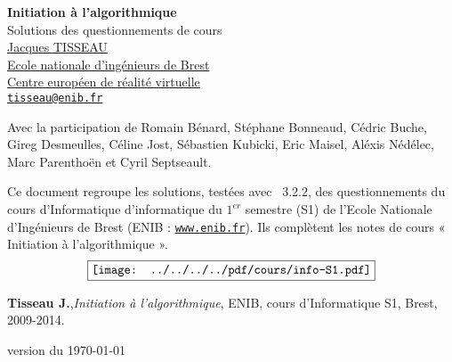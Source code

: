 \documentclass[11pt,a4paper,colorlinks,breaklinks]{article}
\renewcommand{\headrulewidth}{0pt}
\renewcommand{\footrulewidth}{0pt}
\begin{document}

\begin{titlepage}

\thispagestyle{fancy}
\setlength{\headheight}{79pt}
\setlength{\footskip}{20pt}
\renewcommand{\headrulewidth}{0pt}
\renewcommand{\footrulewidth}{0pt}

\begin{center}
{\huge\bf Initiation à l'algorithmique}\\[5mm]
{\huge\sc Solutions des questionnements de cours}\\[1cm]
\href{http://www.enib.fr/~tisseau}{\Large\sc Jacques TISSEAU}\\[3mm]
\href{http://www.enib.fr}{Ecole nationale d'ingénieurs de Brest}\\
\href{http://www.cerv.fr}{Centre européen de réalité virtuelle}\\
\href{mailto:tisseau@enib.fr}{\tt tisseau@enib.fr}
\end{center}
\vspace*{1cm}

{\footnotesize\vspace*{1.5mm}
\noindent Avec la participation de 
{\sc Romain Bénard}, 
{\sc Stéphane Bonneaud}, {\sc Cédric Buche},
{\sc Gireg Desmeulles}, {\sc Céline Jost}, 
{\sc Sébastien Kubicki}, {\sc Eric Maisel}, 
{\sc Aléxis Nédélec}, {\sc Marc Parenthoën} et 
{\sc Cyril Septseault}.
}
\null\vfill

\noindent \noindent Ce document regroupe les solutions, testées avec \python\ 3.2.2,
des questionnements du cours d'Infor\-ma\-tique 
d'informatique 
du $1^{er}$ semestre (S1) de l'Ecole Nationale d'Ingénieurs 
de Brest (ENIB : \href{http://www.enib.fr}{\tt www.enib.fr}).
Ils complètent les notes de cours « Initiation à l'algorithmique ».
$$\fbox{\texttt{[image: ../../../../pdf/cours/info-S1.pdf]}}$$
\centerline{\footnotesize
{\bf Tisseau J.},{\em Initiation à l'algorithmique}, ENIB, cours d'Informatique S1, Brest, 2009-2014.
}
\null\vfill

\centerline{\tiny version du \today}

\end{titlepage}
\end{document}
